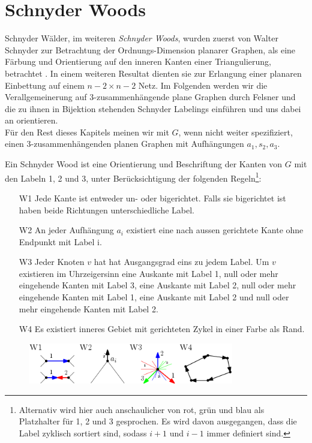 \section{Schnyder Woods}\label{sw}
Schnyder Wälder, im weiteren \textit{Schnyder Woods}, wurden zuerst von Walter Schnyder zur Betrachtung der Ordnungs-Dimension planarer Graphen, als eine Färbung und Orientierung auf den inneren Kanten einer Triangulierung, betrachtet \cite{schnyder89}. In einem weiteren Resultat dienten sie zur Erlangung einer planaren Einbettung auf einem $n-2 \times n-2$ Netz\cite{schnyder90}. Im Folgenden werden wir die Verallgemeinerung auf 3-zusammenhängende plane Graphen durch Felsner \cite{felsner01} und die zu ihnen in Bijektion stehenden Schnyder Labelings einführen und uns dabei an \cite{felsner04} orientieren.\\

Für den Rest dieses Kapitels meinen wir mit $G$, wenn nicht weiter spezifiziert, einen 3-zusammenhängenden planen Graphen mit Aufhängungen $a_1,s_2,a_3$.

\begin{definition}
Ein Schnyder Wood ist eine Orientierung und Beschriftung der Kanten von $G$ mit den Labeln 1, 2 und 3, unter Berücksichtigung der folgenden Regeln\footnote{Alternativ wird hier auch anschaulicher von rot, grün und blau als Platzhalter für 1, 2 und 3 gesprochen. Es wird davon ausgegangen, dass die Label zyklisch sortiert sind, sodass $i+1$ und $i-1$ immer definiert sind.}:
\begin{itemize}
\item[W1] Jede Kante ist entweder un- oder bigerichtet. Falls sie bigerichtet ist haben beide Richtungen unterschiedliche Label.
\item[W2] An jeder Aufhängung  $a_i$ existiert eine nach aussen gerichtete Kante ohne Endpunkt mit Label i.  
\item[W3] Jeder Knoten $v$ hat hat Ausgangsgrad eins zu jedem Label. Um $v$ existieren im Uhrzeigersinn eine Auskante mit Label 1, null oder mehr eingehende Kanten mit Label 3, eine Auskante mit Label 2, null oder mehr  eingehende Kanten mit Label 1, eine Auskante mit Label 2 und null oder mehr  eingehende Kanten mit Label 2.
\item[W4] Es existiert inneres Gebiet mit gerichteten Zykel in einer Farbe als Rand.
\end{itemize}
\end{definition}

\begin{figure}[h]
	\centering
  \includegraphics[width=0.8\textwidth]{schnyder_wood_def.png}
	\label{schnyder_wood}
\end{figure}

